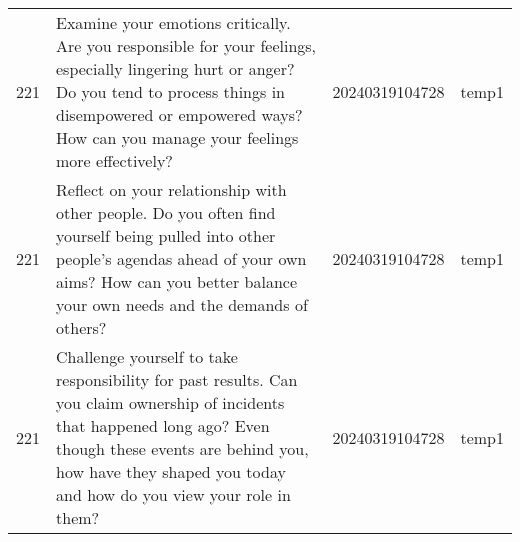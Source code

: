 \begin{longtable}{rlll}
221 &                                                                                                                                                                                                                                                                                                                                                                                                                                                                                                                                                                                                                                                                                                                                    Examine your emotions critically. Are you responsible for your feelings, especially lingering hurt or anger? Do you tend to process things in disempowered or empowered ways? How can you manage your feelings more effectively? & 20240319104728 &       temp1 \\
221 &                                                                                                                                                                                                                                                                                                                                                                                                                                                                                                                                                                                                                                                                                                                                                    Reflect on your relationship with other people. Do you often find yourself being pulled into other people's agendas ahead of your own aims? How can you better balance your own needs and the demands of others? & 20240319104728 &       temp1 \\
221 &                                                                                                                                                                                                                                                                                                                                                                                                                                                                                                                                                                                                                                                                                                                             Challenge yourself to take responsibility for past results. Can you claim ownership of incidents that happened long ago? Even though these events are behind you, how have they shaped you today and how do you view your role in them? & 20240319104728 &       temp1 \\

\end{longtable}
